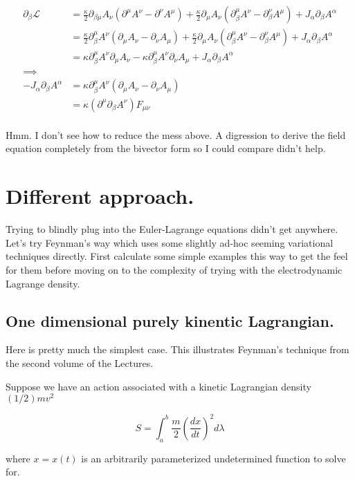 \documentclass{article}
\newcommand{\LL}[0]{\mathcal{L}}
\begin{document}
\begin{align*}
\partial_{\beta} \LL 
&= 
\frac{\kappa}{2}
\partial_{\beta\mu} A_{\nu} ( \partial^{\mu} A^{\nu} - \partial^{\nu} A^{\mu} )
+ \frac{\kappa}{2}
\partial_{\mu} A_{\nu} ( \partial_{\beta}^{\mu} A^{\nu} - \partial_{\beta}^{\nu} A^{\mu} )
+ J_{\alpha} \partial_{\beta}A^{\alpha} \\
&= 
\frac{\kappa}{2} \partial_{\beta}^{\mu} A^{\nu} ( \partial_{\mu} A_{\nu} - \partial_{\nu} A_{\mu} )
+ \frac{\kappa}{2} \partial_{\mu} A_{\nu} ( \partial_{\beta}^{\mu} A^{\nu} - \partial_{\beta}^{\nu} A^{\mu} )
+ J_{\alpha} \partial_{\beta}A^{\alpha} \\
&= 
{\kappa} \partial_{\beta}^{\mu} A^{\nu} \partial_{\mu} A_{\nu}
- {\kappa} \partial_{\beta}^{\mu} A^{\nu} \partial_{\nu} A_{\mu}
+ J_{\alpha} \partial_{\beta}A^{\alpha} \\
\implies \\
-J_{\alpha} \partial_{\beta}A^{\alpha} 
&= {\kappa} \partial_{\beta}^{\mu} A^{\nu} \left( \partial_{\mu} A_{\nu} - \partial_{\nu} A_{\mu} \right) \\
&= {\kappa} (\partial^{\mu} \partial_{\beta}A^{\nu} ) F_{\mu\nu} \\
\end{align*}

Hmm.  I don't see how to reduce the mess above.  A digression to derive the field equation completely from 
the bivector form so I could compare didn't help.

\section{ Different approach. }

Trying to blindly plug into the Euler-Lagrange equations didn't get anywhere.  Let's try Feynman's way 
which uses some slightly ad-hoc seeming variational techniques directly.  First calculate some simple examples
this way to get the feel for them before moving on to the complexity of trying with the electrodynamic Lagrange
density.

\subsection{ One dimensional purely kinentic Lagrangian. }

Here is pretty much the simplest case.  This illustrates Feynman's technique from the second volume of the Lectures.

Suppose we have an action associated with a kinetic Lagrangian density $(1/2) m v^2$

\begin{equation*}
S = \int_a^b \frac{m}{2} { \left(\frac{dx}{dt}\right) }^2 d\lambda
\end{equation*}

where $x = x(t)$ is an arbitrarily parameterized undetermined function to solve for.



\end{document}
